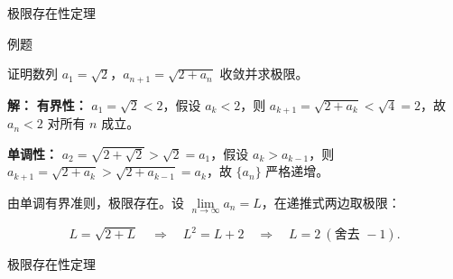 \documentclass[aspectratio=169,10pt,fontset=fandol]{ctexbeamer}
\begin{document}
\begin{frame}[t,fragile]{极限存在性定理}
\normalsize
\begin{block}{例题}
{\normalsize


证明数列 \(a_1 = \sqrt{2}\)，\(a_{n+1} = \sqrt{2 + a_n}\) 收敛并求极限。


}
\end{block}
\pause
{\normalsize
\textbf{解：}
\textbf{有界性：} \(a_1=\sqrt{2}<2\)，假设 \(a_k<2\)，则 \(a_{k+1}=\sqrt{2+a_k}<\sqrt4=2\)，故 \(a_n<2\) 对所有 \(n\) 成立。

\textbf{单调性：} \(a_2 = \sqrt{2+\sqrt{2}} > \sqrt{2} = a_1\)，假设 \(a_k > a_{k-1}\)，则 \(a_{k+1} = \sqrt{2 + a_k} > \sqrt{2 + a_{k-1}} = a_k\)，故 \(\{a_n\}\) 严格递增。

由单调有界准则，极限存在。设 \(\lim \limits_{n \to \infty}a_n = L\)，在递推式两边取极限：

\[

L = \sqrt{2 + L} \quad\Longrightarrow\quad L^2 = L + 2 \quad\Longrightarrow\quad L = 2\ (\text{舍去 } -1).

\]


}
\end{frame}
\begin{frame}[t,fragile]{极限存在性定理}
\normalsize
{\normalsize






\iffalse




}
\end{frame}
\end{document}
